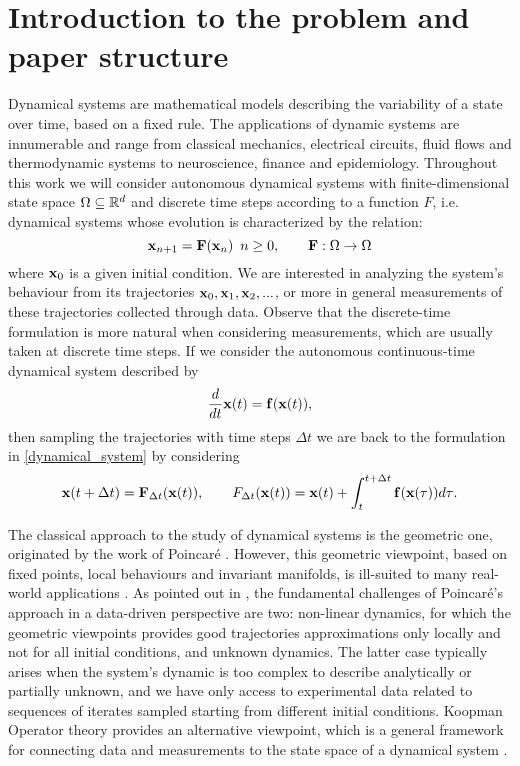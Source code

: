 \section{Introduction to the problem and paper structure}
Dynamical systems are mathematical models describing the variability of a state over time, based on a fixed rule. The applications of dynamic systems are innumerable and range from classical mechanics, electrical circuits, fluid flows and thermodynamic systems to neuroscience, finance and epidemiology. Throughout this work we will consider autonomous dynamical systems with finite-dimensional state space $\Omega\subseteq\mathbb{R}^d$ and discrete time steps according to a function $F$, i.e. dynamical systems whose evolution is characterized by the relation:
\begin{equation}
    \label{dynamical_system}
    \vb{x}_{n+1} = \vb{F}(\vb{x}_n)\,\,\,n\geq 0, \qquad \vb{F}:\Omega \to \Omega
\end{equation}
where $\vb{x}_0$ is a given initial condition. We are interested in analyzing the system's behaviour from its trajectories $\vb{x}_0, \vb{x}_1, \vb{x}_2,...$, or more in general measurements of these trajectories collected through data. Observe that the discrete-time formulation is more natural when considering measurements, which are usually taken at discrete time steps. If we consider the autonomous continuous-time dynamical system described by
\begin{equation*}
    \frac{d}{dt}\vb{x}(t) = \vb{f}(\vb{x}(t)),
\end{equation*}
then sampling the trajectories with time steps $\Delta t$ we are back to the formulation in \eqref{dynamical_system} by considering
\begin{equation}
    \label{continuous_to_discrete}
    \vb{x}(t+\Delta t) = \vb{F}_{\Delta t}(\vb{x}(t)), \qquad \vb\vb{F}_{\Delta t}(\vb{x}(t)) = \vb{x}(t) + \int_{t}^{t+\Delta t}{\vb{f}(\vb{x}(\tau)) d\tau}.
\end{equation}

The classical approach to the study of dynamical systems is the geometric one, originated by the work of Poincaré \cite{henri_poincare_les_1899}. However, this geometric viewpoint, based on fixed points, local behaviours and invariant manifolds, is ill-suited to many real-world applications \cite{budisic_applied_2012}. As pointed out in \cite{colbrook_rigorous_2021}, the fundamental challenges of Poincaré's approach in a data-driven perspective are two: non-linear dynamics, for which the geometric viewpoints provides good trajectories approximations only locally and not for all initial conditions, and unknown dynamics. The latter case typically arises when the system's dynamic is too complex to describe analytically or partially unknown, and we have only access to experimental data related to sequences of iterates sampled starting from different initial conditions. Koopman Operator theory \cite{koopman_dynamical_1932, koopman_hamiltonian_1931} provides an alternative viewpoint, which is a general framework for connecting data and measurements to the state space of a dynamical system \cite{arbabi_introduction_2018}.
